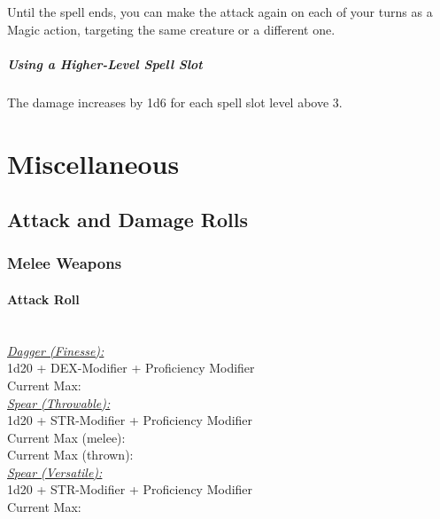 \documentclass[letterpaper,openany,oneside,twocolumn]{book}
\begin{document}
Until the spell ends, you can make the attack again on each of your turns as a Magic action, targeting the same creature or a different one.

\subparagraph*{Using a Higher-Level Spell Slot} The damage increases by 1d6 for each spell slot level above 3.
\vfill\eject
\section*{Miscellaneous}
\subsection*{Attack and Damage Rolls}
\subsubsection*{Melee Weapons}
\paragraph*{Attack Roll}\hfill\\
\underline{\textit{Dagger (Finesse):}}\\
1d20 + DEX-Modifier + Proficiency Modifier\\
\indent Current Max: 
\\
\underline{\textit{Spear (Throwable):}}\\
1d20 + STR-Modifier + Proficiency Modifier\\
\indent Current Max (melee): \\
\indent Current Max (thrown): 
\\
\underline{\textit{Spear (Versatile):}}\\
1d20 + STR-Modifier + Proficiency Modifier\\
\indent Current Max: 
\end{document}
